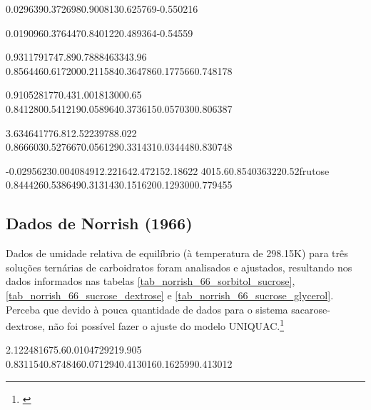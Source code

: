 %
	{0.029639}{0.372698}{0.900813}{0.625769}{-0.550216}

%
	{0.019096}{0.376447}{0.840122}{0.489364}{-0.54559}

%
	{0.931179}{1747.89}{0.788846}{3343.96}
%
	{0.856446}{0.617200}{0.211584}{0.364786}{0.177566}{0.748178}

%
	{0.910528}{1770.43}{1.00181}{3000.65}
%
	{0.841280}{0.541219}{0.058964}{0.373615}{0.057030}{0.806387}

%
	{3.63464}{1776.81}{2.52239}{788.022}
%
	{0.866603}{0.527667}{0.056129}{0.331431}{0.034448}{0.830748}

%
	{-0.0295623}{0.00408491}{2.22164}{2.47215}{2.18622}
%
	{4015.6}{0.854036}{3220.52}{frutose}
%
	{0.844426}{0.538649}{0.313143}{0.151620}{0.129300}{0.779455}

\FloatBarrier

\subsection{Dados de Norrish (1966)}

Dados de umidade relativa de equilíbrio (à temperatura de 298.15K) para três
soluções ternárias de carboidratos foram analisados e ajustados, resultando
nos dados informados nas tabelas \ref{tab_norrish_66_sorbitol_sucrose},
\ref{tab_norrish_66_sucrose_dextrose} e \ref{tab_norrish_66_sucrose_glycerol}.
Perceba que devido à pouca quantidade de dados para o sistema sacarose-dextrose,
não foi possível fazer o ajuste do modelo UNIQUAC.\footnote{\cite{norrish1966}}

%
	{2.12248}{1675.6}{0.0104729}{219.905}
%
	{0.831154}{0.874846}{0.071294}{0.413016}{0.162599}{0.413012}

